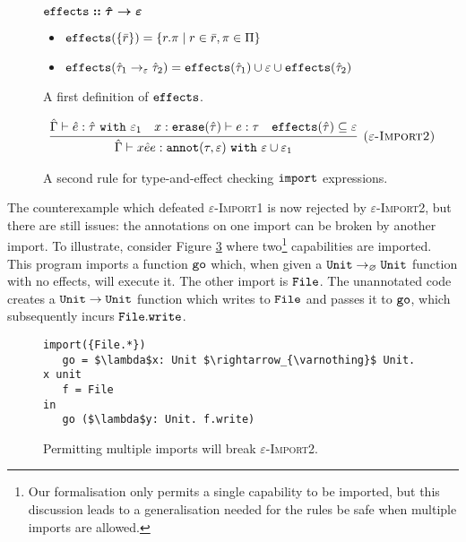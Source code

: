 \begin{figure}[h]

$\bm{\mathtt{effects :: \hat \tau \rightarrow \varepsilon}}$ \begin{itemize}
	\setlength\itemsep{-0.7em}
	\item[] $\mathtt{effects}(\{ \bar r \}) = \{ r.\pi \mid r \in \bar r, \pi \in \Pi \}$
	\item[] $\mathtt{effects}(\hat \tau_1 \rightarrow_{\varepsilon} \hat \tau_2) = \mathtt{effects}(\hat \tau_1) \cup \varepsilon \cup \mathtt{effects}(\hat \tau_2)$
\end{itemize}
\vspace{-7pt}
\caption{A first definition of $\mathtt{effects}$.}
\label{fig:fx_defn}
\end{figure}

\begin{figure}[h]

\[
\begin{array}{c}

\infer[\textsc{($\varepsilon$-Import2)}]
	{ \hat \Gamma \vdash {x}{\hat e}{e}: \kwa{annot}(\tau, \varepsilon)~\kw{with} \varepsilon \cup \varepsilon_1 }
	{ \hat \Gamma \vdash \hat e: \hat \tau~\kw{with} \varepsilon_1 & x: \kwa{erase}(\hat \tau) \vdash e: \tau & \kwa{effects}(\hat \tau) \subseteq \varepsilon}

\end{array}
\]
\vspace{-7pt}
\caption{A second rule for type-and-effect checking $\mathtt{import}$ expressions.}
\label{fig:import_rule_2}
\end{figure}

The counterexample which defeated \textsc{$\varepsilon$-Import1} is now rejected by \textsc{$\varepsilon$-Import2}, but there are still issues: the annotations on one import can be broken by another import. To illustrate, consider Figure \ref{fig:rule_import2_counterexample} where two\footnote{Our formalisation only permits a single capability to be imported, but this discussion leads to a generalisation needed for the rules be safe when multiple imports are allowed.} capabilities are imported. This program imports a function $\mathtt{go}$ which, when given a $\mathtt{Unit} \rightarrow_{\varnothing} \mathtt{Unit}$ function with no effects, will execute it. The other import is $\mathtt{File}$. The unannotated code creates a $\mathtt{Unit} \rightarrow \mathtt{Unit}$ function which writes to $\mathtt{File}$ and passes it to $\mathtt{go}$, which subsequently incurs $\mathtt{File.write}$.

\begin{figure}[h]

\begin{lstlisting}
import({File.*})
   go = $\lambda$x: Unit $\rightarrow_{\varnothing}$ Unit. x unit
   f = File
in
   go ($\lambda$y: Unit. f.write)

\end{lstlisting}

\vspace{-7pt}
\caption{Permitting multiple imports will break \textsc{$\varepsilon$-Import2}.}
\label{fig:rule_import2_counterexample}
\end{figure}

